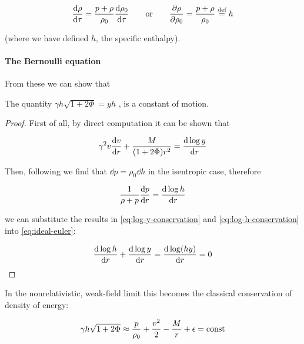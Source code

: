 \documentclass[main.tex]{subfiles}
\begin{document}
\begin{equation} \label{eq:enthalpy-definition}
    \dv{\rho}{\tau} = \frac{p+\rho}{\rho_0} \dv{\rho_0}{\tau}
    \qquad
    \text{or}
    \qquad
    \pdv{\rho}{\rho_0} = \frac{p + \rho}{\rho_0} \defeq h
\end{equation}

(where we have defined $h$, the specific enthalpy).

\paragraph{The Bernoulli equation}

From these we can show that

\begin{claim}
  The quantity $\gamma h \sqrt{1+2\Phi} = yh$ , is a constant of motion.
\end{claim}

\begin{proof}
First of all, by direct computation it can be shown that

\begin{equation} \label{eq:log-y-conservation}
  \gamma^2 v \dv{v}{r} + \frac{M}{(1+ 2 \Phi) r^2} = \dv{\log y }{r}
\end{equation}

Then, following \textcite[section 6.3]{Gourgoulhon:2006bn} we find that \(\dd{p} = \rho_0 \dd{h}\) in the isentropic case, therefore

\begin{equation} \label{eq:log-h-conservation}
  \frac{1}{\rho + p} \dv{p}{r}  =  \dv{\log h}{r}
\end{equation}

we can substitute the results in \eqref{eq:log-y-conservation} and \eqref{eq:log-h-conservation} into \eqref{eq:ideal-euler}:

\begin{equation}
  \dv{\log h}{r} + \dv{\log y }{r} = \dv{\log (hy) }{r} = 0
\end{equation}

\end{proof}

In the nonrelativistic, weak-field limit this  becomes the classical conservation of density of energy:

\begin{equation}
    \gamma h \sqrt{1+2\Phi} \approx \frac{p}{\rho_0} + \frac{v^2}{2} - \frac{M}{r} + \epsilon = \const
\end{equation}
\end{document}
